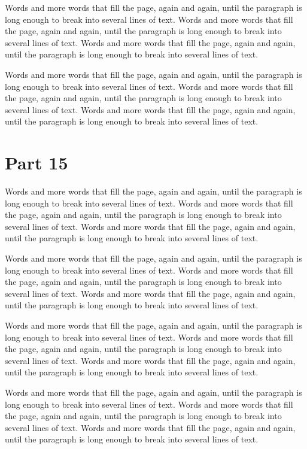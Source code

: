\documentclass{article}
\begin{document}
Words and more words that fill the page, again and again, until the paragraph is long enough to break into several lines of text. Words and more words that fill the page, again and again, until the paragraph is long enough to break into several lines of text. Words and more words that fill the page, again and again, until the paragraph is long enough to break into several lines of text. 

Words and more words that fill the page, again and again, until the paragraph is long enough to break into several lines of text. Words and more words that fill the page, again and again, until the paragraph is long enough to break into several lines of text. Words and more words that fill the page, again and again, until the paragraph is long enough to break into several lines of text. 

\section{Part 15}
Words and more words that fill the page, again and again, until the paragraph is long enough to break into several lines of text. Words and more words that fill the page, again and again, until the paragraph is long enough to break into several lines of text. Words and more words that fill the page, again and again, until the paragraph is long enough to break into several lines of text. 

Words and more words that fill the page, again and again, until the paragraph is long enough to break into several lines of text. Words and more words that fill the page, again and again, until the paragraph is long enough to break into several lines of text. Words and more words that fill the page, again and again, until the paragraph is long enough to break into several lines of text. 

Words and more words that fill the page, again and again, until the paragraph is long enough to break into several lines of text. Words and more words that fill the page, again and again, until the paragraph is long enough to break into several lines of text. Words and more words that fill the page, again and again, until the paragraph is long enough to break into several lines of text. 

Words and more words that fill the page, again and again, until the paragraph is long enough to break into several lines of text. Words and more words that fill the page, again and again, until the paragraph is long enough to break into several lines of text. Words and more words that fill the page, again and again, until the paragraph is long enough to break into several lines of text. 
\end{document}

